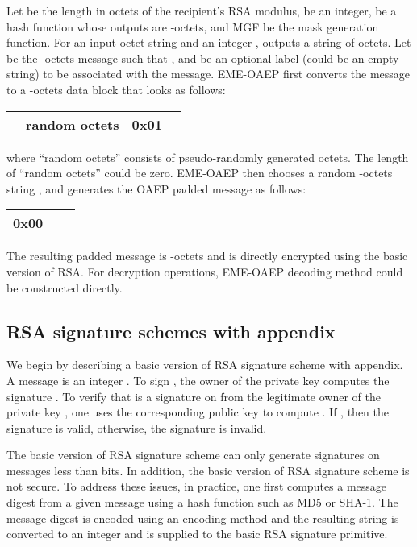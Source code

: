 \documentclass{article}
\begin{document}
Let  be the length in octets of the recipient's RSA modulus,
 be an integer,  be a hash function whose outputs are
-octets, and MGF be the mask generation function. For 
an input octet string  and an integer ,  
outputs a string of  octets. Let  be the -octets message
such that , 
and  be an optional label (could be an empty string) to be associated 
with the message. EME-OAEP first converts the message  to 
a -octets data block  that looks as follows:
\begin{center}
\begin{tabular}{|c|c|c|c|}\hline
 & random octets & 0x01 & \\ \hline
\end{tabular}
\end{center}
where ``random octets'' consists of pseudo-randomly generated octets.
The length of ``random octets'' could be zero. EME-OAEP then chooses
a random -octets string , and generates the OAEP padded message
 as follows:
\begin{center}
\begin{tabular}{|c|c|c|}\hline
0x00 &  
&    \\ \hline
\end{tabular}
\end{center}
The resulting padded message  is -octets and is directly 
encrypted using the basic version of
RSA. For decryption operations, EME-OAEP decoding method could 
be constructed directly.

\subsection{RSA signature schemes with appendix}
We begin by describing a basic version of 
RSA signature scheme with appendix. A message is an integer . 
To sign , the owner of the 
private key  computes the signature .
To verify that  is a signature on  from the legitimate 
owner of the private key , one uses the corresponding
public key  to compute .
If , then the signature is valid, otherwise, the signature is invalid.

The basic version of RSA signature scheme 
can only generate signatures on messages less than  bits.
In addition, the basic version of RSA signature scheme is not secure.
To address these issues, 
in practice, one first computes a message digest from 
a given message using a hash function such as MD5 or SHA-1.
The message digest is encoded using an encoding method
and the resulting string is converted to an integer and is
supplied to the basic RSA signature primitive.
\end{document}
